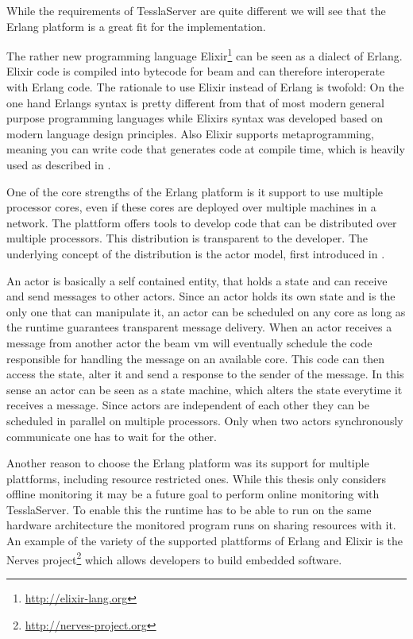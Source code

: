 While the requirements of TesslaServer are quite different we will see that the Erlang platform is a great fit for the implementation.

The rather new programming language Elixir\footnote{\url{http://elixir-lang.org}} can be seen as a dialect of Erlang.
Elixir code is compiled into bytecode for \gls{beam} and can therefore interoperate with Erlang code.
The rationale to use Elixir instead of Erlang is twofold:
On the one hand Erlangs syntax is pretty different from that of most modern general purpose programming languages while Elixirs syntax was developed based on modern language design principles.
Also Elixir supports metaprogramming, meaning you can write code that generates code at compile time, which is heavily used as described in .

One of the core strengths of the Erlang platform is it support to use multiple processor cores, even if these cores are deployed over multiple machines in a network.
The plattform offers tools to develop code that can be distributed over multiple processors.
This distribution is transparent to the developer.
The underlying concept of the distribution is the actor model, first introduced in \cite{Hewitt1973}.

An actor is basically a self contained entity, that holds a state and can receive and send messages to other actors.
Since an actor holds its own state and is the only one that can manipulate it, an actor can be scheduled on any core as long as the runtime guarantees transparent message delivery.
When an actor receives a message from another actor the \gls{beam} \gls{vm} will eventually schedule the code responsible for handling the message on an available core.
This code can then access the state, alter it and send a response to the sender of the message.
In this sense an actor can be seen as a state machine, which alters the state everytime it receives a message.
Since actors are independent of each other they can be scheduled in parallel on multiple processors.
Only when two actors synchronously communicate one has to wait for the other.


Another reason to choose the Erlang platform was its support for multiple plattforms, including resource restricted ones.
While this thesis only considers offline monitoring it may be a future goal to perform online monitoring with TesslaServer.
To enable this the runtime has to be able to run on the same hardware architecture the monitored program runs on sharing resources with it.
An example of the variety of the supported plattforms of Erlang and Elixir is the Nerves project\footnote{\url{http://nerves-project.org}} which allows developers to build embedded software.



